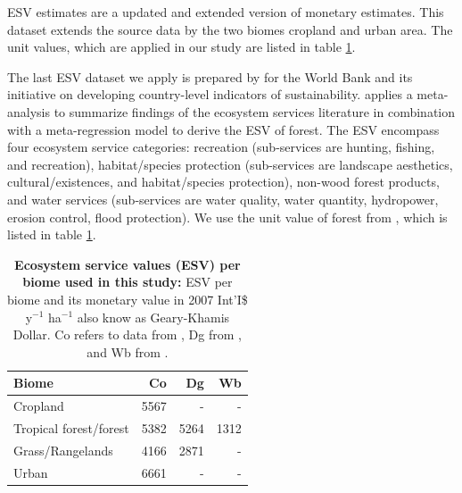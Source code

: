 		\citet{Costanza2014} \ac{ESV} estimates are a updated and extended version of \citet{Groot2012} monetary estimates. This dataset extends the source data by the two biomes cropland and urban area. The unit values, which are applied in our study are listed in table \ref{tab:esv_factors}.

		The last \ac{ESV} dataset we apply is prepared by \citet{Siikamaki2015} for the World Bank and its initiative on developing country-level indicators of sustainability. \citeauthor{Siikamaki2015} applies a meta-analysis to summarize findings of the ecosystem services literature in combination with a meta-regression model to derive the \ac{ESV} of forest. The \ac{ESV} encompass four ecosystem service categories: recreation (sub-services are hunting, fishing, and recreation), habitat/species protection (sub-services are landscape aesthetics, cultural/existences, and habitat/species protection), non-wood forest products, and water services (sub-services are water quality, water quantity, hydropower, erosion control, flood protection). We use the unit value of forest from \citeauthor{Siikamaki2015}, which is listed in table \ref{tab:esv_factors}.
		\begin{table}[ht]
			\centering
			\caption[Ecosystem service values (ESV) used in this study]{\textbf{Ecosystem service values (ESV) per biome used in this study:} ESV per biome and its monetary value in 2007 Int'I\$ y$^{-1}$ ha$^{-1}$ also know as Geary-Khamis Dollar. Co refers to data from \citet{Costanza2014}, Dg from \citet{Groot2012}, and Wb from \citet{Siikamaki2015}.}
			\label{tab:esv_factors}
			\begin{tabular}{lrrr}
				\hline
				Biome & Co & Dg & Wb \\\hline
				Cropland & 5567 & - & -\\
				Tropical forest/forest & 5382 & 5264 & 1312\\
				Grass/Rangelands & 4166 & 2871 & -\\
				Urban & 6661 & - & -\\\hline
			\end{tabular}
		\end{table}

